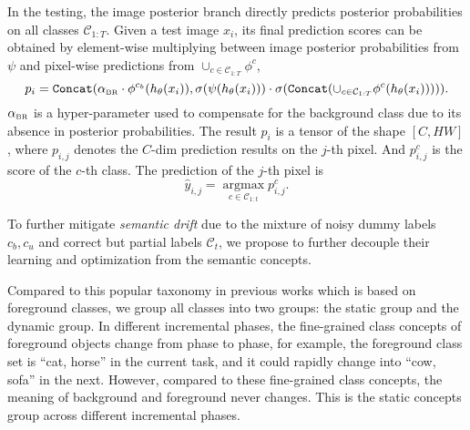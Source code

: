 In the testing, the image posterior branch directly predicts posterior probabilities on all classes $\mathcal{C}_{1:T}$. Given a test image $x_i$, its final prediction scores can be obtained by element-wise multiplying between image posterior probabilities from $\psi$ and pixel-wise predictions from $\cup_{c\in\mathcal{C}_{1:T}}\phi^c$, 
\begin{equation}
    p_{i} = \texttt{Concat}(\alpha_{\text{\tiny BR}} \cdot \phi^{c_b}(h_\theta(x_{i})), \sigma(\psi(h_\theta(x_i))) \cdot \sigma(\texttt{Concat}(\cup_{c\in\mathcal{C}_{1:T}}\phi^{c}(h_\theta(x_{i}))))).
\end{equation}
$\alpha_{\text{\tiny BR}}$ is a hyper-parameter used to compensate for the background class due to its absence in posterior probabilities. The result $p_i$ is a tensor of the shape $[C, HW]$, where $p_{i,j}$ denotes the $C$-dim prediction results on the $j$-th pixel. And $p_{i,j}^c$ is the score of the $c$-th class. The prediction of the $j$-th pixel is
\begin{equation}
    \hat{y}_{i,j} = \mathop{\arg\max}\limits_{c\in\mathcal{C}_{1:t}} p_{i,j}^c.
\end{equation}
\fi

\iffalse
To further mitigate \textit{semantic drift} due to the mixture of noisy dummy labels $c_b, c_u$ and correct but partial labels $\mathcal{C}_t$, we propose to further decouple their learning and optimization from the semantic concepts. 

Compared to this popular taxonomy in previous works which is based on foreground classes, we group all classes into two groups: the static group and the dynamic group. In different incremental phases, the fine-grained class concepts of foreground objects change from phase to phase, for example, the foreground class set is ``cat, horse'' in the current task, and it could rapidly change into ``cow, sofa'' in the next. However, compared to these fine-grained class concepts, the meaning of background and foreground never changes. This is the static concepts group across different incremental phases. 

